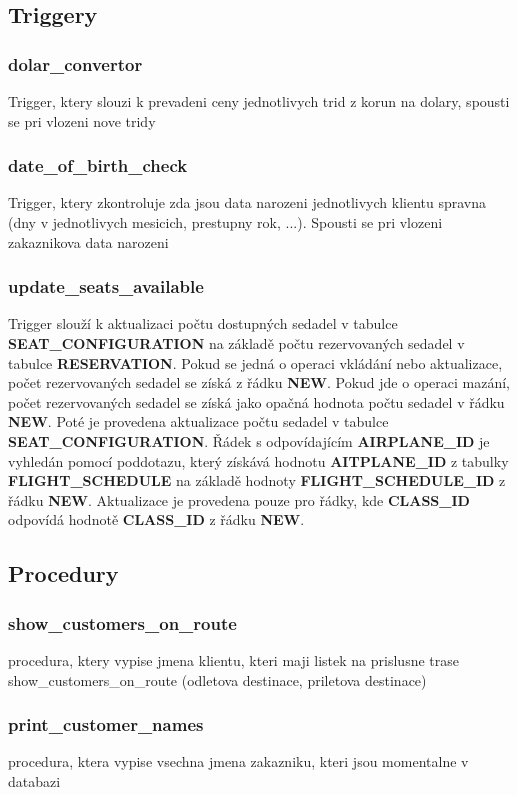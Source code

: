 \documentclass[a4paper, 11pt]{article}
\begin{document}
{    \subsection{Triggery}
    \subsubsection{dolar\_convertor}
        Trigger, ktery slouzi k prevadeni ceny jednotlivych trid z korun na dolary, spousti se pri vlozeni nove tridy
    \subsubsection{date\_of\_birth\_check}
        Trigger,  ktery zkontroluje zda jsou data narozeni jednotlivych klientu spravna (dny v jednotlivych mesicich, prestupny rok, ...). Spousti se pri vlozeni zakaznikova data narozeni  
    \subsubsection{update\_seats\_available}
        Trigger slouží k aktualizaci počtu dostupných sedadel v tabulce \textbf{SEAT\_CONFIGURATION} na základě počtu rezervovaných sedadel v tabulce \textbf{RESERVATION}. Pokud se jedná o operaci vkládání nebo aktualizace, počet rezervovaných sedadel se získá z řádku \textbf{NEW}. Pokud jde o operaci mazání, počet rezervovaných sedadel se získá jako opačná hodnota počtu sedadel v řádku \textbf{NEW}. Poté je provedena aktualizace počtu sedadel v tabulce \textbf{SEAT\_CONFIGURATION}. Řádek s odpovídajícím \textbf{AIRPLANE\_ID} je vyhledán pomocí poddotazu, který získává hodnotu \textbf{AITPLANE\_ID} z tabulky \textbf{FLIGHT\_SCHEDULE} na základě hodnoty \textbf{FLIGHT\_SCHEDULE\_ID} z řádku \textbf{NEW}. Aktualizace je provedena pouze pro řádky, kde \textbf{CLASS\_ID} odpovídá hodnotě \textbf{CLASS\_ID} z řádku \textbf{NEW}.
     \subsection{Procedury}
        \subsubsection{show\_customers\_on\_route}
        procedura, ktery vypise jmena klientu, kteri maji listek na prislusne trase show\_customers\_on\_route (odletova destinace, priletova destinace)
    \subsubsection{print\_customer\_names}
     procedura, ktera vypise vsechna jmena zakazniku, kteri jsou momentalne v databazi
}
\end{document}
